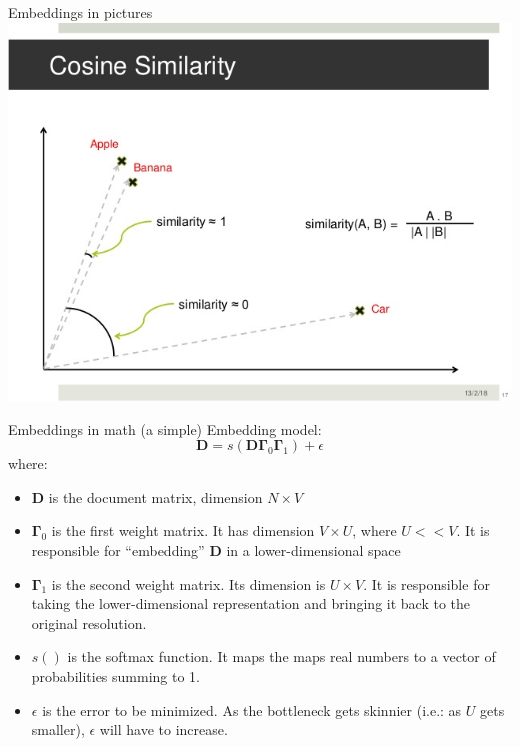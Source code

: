 \documentclass[10pt]{beamer}
\begin{document}
\begin{frame}{Embeddings in pictures}
\centering
\includegraphics[width=.9\textwidth]{cosine_sim_2.jpg}
\end{frame}

\begin{frame}{Embeddings in math}
(a simple) Embedding model:
\[
\bm{D} = s\left(\bm{D\Gamma}_0\bm{\Gamma}_1\right) + \epsilon
\]
where:
\begin{itemize}
\item $\bm{D}$ is the document matrix, dimension $N\times V$
\item $\bm{\Gamma}_0$ is the first weight matrix.  It has dimension $V \times U$, where $U << V$.  It is responsible for ``embedding'' $\bm{D}$ in a lower-dimensional space
\item $\bm{\Gamma}_1$ is the second weight matrix.  Its dimension is $U \times V$.  It is responsible for taking the lower-dimensional representation and bringing it back to the original resolution.
\item $s()$ is the softmax function.  It maps the maps real numbers to a vector of probabilities summing to 1.
\item $\epsilon$ is the error to be minimized.  As the bottleneck gets skinnier (i.e.: as $U$ gets smaller), $\epsilon$ will have to increase.
\end{itemize}
\end{frame}
\end{document}
